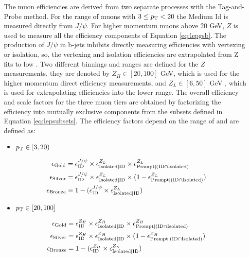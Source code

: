 The muon efficiencies are derived from two separate processes with the Tag-and-Probe method. For the range of muons with $3 \leq p_{\mathrm{T}} < 20$ the Medium Id is measured directly from $J/\psi$. For higher momentum muons above 20 GeV, $Z$ is used to measure all the efficiency components of Equation \ref{eq:lepgsb}. The production of $J/\psi$ in  b-jets inhibits directly measuring efficiencies with vertexing or isolation, so, the vertexing and isolation efficiencies are extrapolated from Z fits to low \pt. Two different binnings and ranges are defined for the $Z$ measurements, they are denoted by $Z_H \in [20,100]$ GeV, which is used for the higher momentum direct efficiency measurements, and $Z_L \in [6,50]$ GeV , which is used for extrapolating efficiencies into the lower \pt range. The overall efficiency and scale factors for the three muon tiers are obtained by factorizing the efficiency into mutually exclusive components from the subsets defined in Equation \ref{eq:lepsubsets}. The efficiency factors depend on the range of \pt and are defined as:


\begin{itemize}
\item[] $p_{\mathrm{T}} \in [3,20)$
\end{itemize}
\begin{equation}\label{eq:effcomp_J}
\begin{split}
\epsilon_{\text{Gold}}& = \epsilon_{\text{ID}}^{J/\psi}\times \epsilon_{\text{Isolated}|\text{ID}}^{Z_L} \times \epsilon_{\text{Prompt}|(\text{ID} \cap \text{Isolated})}^{Z_L} \\
\epsilon_{\text{Silver}}& = \epsilon_{\text{ID}}^{J/\psi} \times \epsilon_{\text{Isolated}|\text{ID}}^{Z_L} \times (1-\epsilon_{\text{Prompt}|(\text{ID} \cap \text{Isolated})}^{Z_L}) \\
\epsilon_{\text{Bronze}}& = 1-(\epsilon_{\text{ID}}^{J/\psi} \times \epsilon_{\text{Isolated}|\text{ID}}^{Z_L})
\end{split}
\end{equation}
\begin{itemize}
\item[] $p_{\mathrm{T}} \in [20,100 ]$
\end{itemize}
\begin{equation}\label{eq:effcomp_Z}
\begin{split}
\epsilon_{\text{Gold}}& = \epsilon_{\text{ID}}^{Z_H}\times\epsilon_{\text{Isolated}|\text{ID}}^{Z_H}\times\epsilon_{\text{Prompt}|(\text{ID} \cap \text{Isolated})}^{Z_H} \\
\epsilon_{\text{Silver}}& = \epsilon_{\text{ID}}^{Z_H}\times\epsilon_{\text{Isolated}|\text{ID}}^{Z_H}\times(1-\epsilon_{\text{Prompt}|(\text{ID} \cap \text{Isolated})}^{Z_H})\\
\epsilon_{\text{Bronze}}& = 1-(\epsilon_{\text{ID}}^{Z_H} \times \epsilon_{\text{Isolated}|\text{ID}}^{Z_H})
\end{split}
\end{equation}


